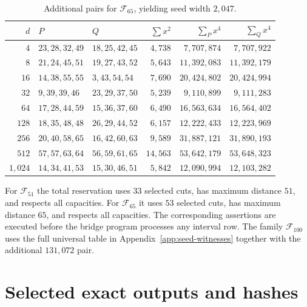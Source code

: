 \documentclass[11pt]{article}
\theoremstyle{definition}
\theoremstyle{remark}
\begin{document}
\begin{table}[ht]
\centering
\caption{Additional pairs for $\mathcal F_{65}$, yielding seed width $2{,}047$.}
\small
\begin{tabular}{@{}rllrrr@{}}
\toprule
$d$ & $P$ & $Q$ & $\sum x^2$ & $\sum_Px^4$ & $\sum_Qx^4$\\
\midrule
$4$ & $23,28,32,49$ & $18,25,42,45$ & $4{,}738$ & $7{,}707{,}874$ & $7{,}707{,}922$\\
$8$ & $21,24,45,51$ & $19,27,43,52$ & $5{,}643$ & $11{,}392{,}083$ & $11{,}392{,}179$\\
$16$ & $14,38,55,55$ & $3,43,54,54$ & $7{,}690$ & $20{,}424{,}802$ & $20{,}424{,}994$\\
$32$ & $9,39,39,46$ & $23,29,37,50$ & $5{,}239$ & $9{,}110{,}899$ & $9{,}111{,}283$\\
$64$ & $17,28,44,59$ & $15,36,37,60$ & $6{,}490$ & $16{,}563{,}634$ & $16{,}564{,}402$\\
$128$ & $18,35,48,48$ & $26,29,44,52$ & $6{,}157$ & $12{,}222{,}433$ & $12{,}223{,}969$\\
$256$ & $20,40,58,65$ & $16,42,60,63$ & $9{,}589$ & $31{,}887{,}121$ & $31{,}890{,}193$\\
$512$ & $57,57,63,64$ & $56,59,61,65$ & $14{,}563$ & $53{,}642{,}179$ & $53{,}648{,}323$\\
$1{,}024$ & $14,34,41,53$ & $15,30,46,51$ & $5{,}842$ & $12{,}090{,}994$ & $12{,}103{,}282$\\
\bottomrule
\end{tabular}
\end{table}

For $\mathcal F_{51}$ the total reservation uses $33$ selected cuts, has
maximum distance $51$, and respects all capacities.  For $\mathcal F_{65}$ it
uses $53$ selected cuts, has maximum distance $65$, and respects all
capacities.  The corresponding assertions are executed before the bridge
program processes any interval row.  The family $\mathcal F_{100}$ uses the
full universal table in Appendix~\ref{app:seed-witnesses} together with the
additional $131{,}072$ pair.

\section{Selected exact outputs and hashes}\label{app:hashes}
\end{document}
